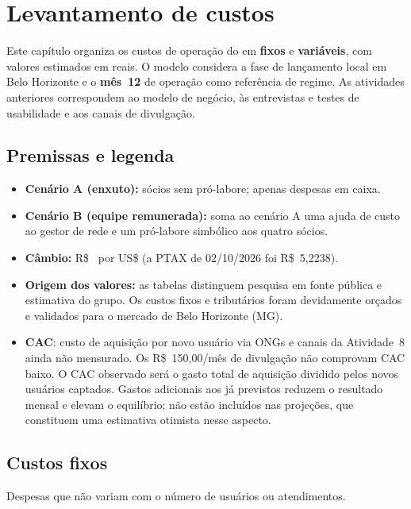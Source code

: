 \section{Levantamento de custos}
\label{sec:custos}

Este capítulo organiza os custos de operação do \projeto{} em \textbf{fixos} e \textbf{variáveis},
com valores estimados em reais. O modelo considera a fase de lançamento local em Belo
Horizonte e o \textbf{mês~12} de operação como referência de regime. As
atividades anteriores correspondem ao modelo de negócio, às entrevistas e
testes de usabilidade e aos canais de divulgação.

\subsection{Premissas e legenda}

\begin{itemize}
  \item \textbf{Cenário A (enxuto):} sócios sem pró-labore; apenas despesas em caixa.
  \item \textbf{Cenário B (equipe remunerada):} soma ao cenário A uma ajuda de custo ao gestor de
  rede e um pró-labore simbólico aos quatro sócios.
  \item \textbf{Câmbio:} R\$~\cambio{} por US\$ (a PTAX de 02/10/2026 foi R\$~5,2238).
  \item \textbf{Origem dos valores:} as tabelas distinguem pesquisa em fonte pública e
  estimativa do grupo. Os custos fixos e tributários foram devidamente orçados e validados para o mercado de Belo Horizonte (MG).
  \item \textbf{CAC}: custo de aquisição por novo usuário via ONGs e canais da
  Atividade~8 ainda não mensurado. Os R\$~150,00/mês de divulgação não comprovam CAC baixo.
  O CAC observado será o gasto total de aquisição dividido pelos novos usuários captados.
  Gastos adicionais aos já previstos reduzem o resultado mensal e elevam o equilíbrio;
  não estão incluídos nas projeções, que constituem uma estimativa otimista nesse aspecto.
\end{itemize}

\subsection{Custos fixos}
\label{sec:custos-fixos}

Despesas que não variam com o número de usuários ou atendimentos.

